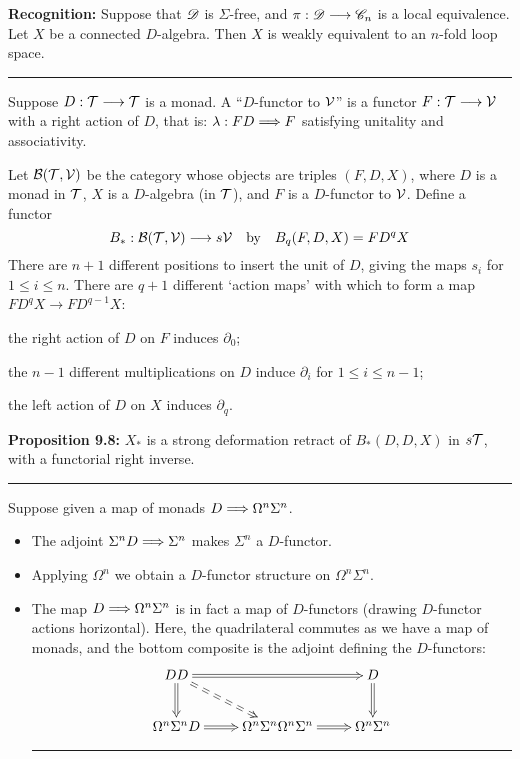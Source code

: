 \documentclass[11pt]{article}
\begin{document}
\begin{Operads}
\begin{itemise}
\item \textbf{Recognition:} 
Suppose that $\mathscr{D}$ is $\Sigma$-free, and $\pi:\mathscr{D}\longrightarrow\mathscr{C}_n$ is a local equivalence. Let $X$ be a connected $D$-algebra. Then $X$ is weakly equivalent to an $n$-fold loop space.
\hrule
\item Suppose $D:\mathcal{T}\longrightarrow\mathcal{T}$ is a monad. A ``$D$-functor to $\mathcal{V}$'' is a functor $F:\mathcal{T}\longrightarrow \mathcal{V}$ with a right action of $D$, that is: $\lambda:FD\Longrightarrow F$ satisfying unitality and associativity.
\item Let $\mathcal{B}(\mathcal{T},\mathcal{V})$ be the category whose objects are triples $(F,D,X)$, where $D$ is a monad in $\mathcal{T}$, $X$ is a $D$-algebra (in $\mathcal{T}$), and $F$ is a $D$-functor to $\mathcal{V}$. Define a functor
\[B_*:\mathcal{B}(\mathcal{T},\mathcal{V})\longrightarrow s\mathcal{V}\textup{\quad by\quad}B_q(F,D,X)=FD^qX\]
There are $n+1$ different positions to insert the unit of $D$, giving the maps $s_i$ for $1\leq i\leq n$. There are $q+1$ different `action maps' with which to form a map $FD^qX\to FD^{q-1}X$: 
\begin{itemise}
\item the right action of $D$ on $F$ induces $\partial_0$;
\item the $n-1$ different multiplications on $D$ induce $\partial_i$ for $1\leq i\leq n-1$;
\item the left action of $D$ on $X$ induces $\partial_q$.
\end{itemise}
\item \textbf{Proposition 9.8:} $X_*$ is a strong deformation retract of $B_*(D,D,X)$ in $s\mathcal{T}$, with a functorial right inverse.
\hrule
\item Suppose given a map of monads $D\Longrightarrow\Omega^n\Sigma^n$.
\begin{itemize}\squishlist
\item The adjoint $\Sigma^nD\Longrightarrow\Sigma^n$ makes $\Sigma^n$ a $D$-functor.
\item Applying $\Omega^n$ we obtain a $D$-functor structure on $\Omega^n\Sigma^n$.
\item The map $D\Longrightarrow\Omega^n\Sigma^n$ is in fact a map of $D$-functors (drawing $D$-functor actions horizontal). Here, the quadrilateral commutes as we have a map of monads, and the bottom composite is the adjoint defining the $D$-functors:
\[\xymatrix{
DD\ar@{=>}[rr]\ar@{==>}[rd]\ar@{=>}[d]&&D\ar@{=>}[d]\\
\Omega^n\Sigma^nD\ar@{=>}[r]&
\Omega^n\Sigma^n\Omega^n\Sigma^n\ar@{=>}[r]&\Omega^n\Sigma^n
}\]
\hrule
\end{itemize}



\end{itemise}
\end{Operads}
\end{document}
